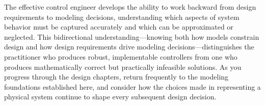 The effective control engineer develops the ability to work backward from design requirements to modeling decisions, understanding which aspects of system behavior must be captured accurately and which can be approximated or neglected. This bidirectional understanding—knowing both how models constrain design and how design requirements drive modeling decisions—distinguishes the practitioner who produces robust, implementable controllers from one who produces mathematically correct but practically infeasible solutions. As you progress through the design chapters, return frequently to the modeling foundations established here, and consider how the choices made in representing a physical system continue to shape every subsequent design decision.
